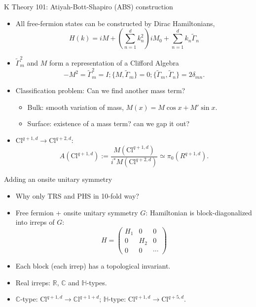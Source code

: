 \documentclass[xcolor=table, 11pt, aspectratio=169]{beamer}
\begin{document}
  \begin{frame}{K Theory 101: Atiyah-Bott-Shapiro (ABS) construction}
    \begin{itemize}
      \item All free-fermion states can be constructed by Dirac Hamiltonians,
      \[H(k)=iM+\left(\sum_{n=1}^d k_n^2\right)iM_0+\sum_{n=1}^d k_n\tilde{\Gamma}_n\]
      \item $\tilde \Gamma_m^2$ and $M$ form a representation of a Clifford Algebra
      \[-M^2=\tilde \Gamma_m^2=I; \{M,\tilde\Gamma_m\}=0;
      \{\tilde\Gamma_m,\tilde\Gamma_n\}=2\delta_{mn}.\]
      \item Classification problem: Can we find another mass term?
      \begin{itemize}
        \item Bulk: smooth variation of mass, $M(x)=M\cos x+M'\sin x$.
        \item Surface: existence of a mass term? can we gap it out?
      \end{itemize}
      \item $\mathrm{Cl}^{q+1,d}\rightarrow\mathrm{Cl}^{q+2,d}$:
      \[A(\mathrm{Cl}^{q+1,d}):=\frac{M(\mathrm{Cl}^{q+1,d})}{i^\ast M(\mathrm{Cl}^{q+2,d})}\simeq\pi_0(R^{q+1,d}).\]
    \end{itemize}
  \end{frame}

  \begin{frame}{Adding an onsite unitary symmetry}
    \begin{itemize}
      \item Why only TRS and PHS in 10-fold way?
      \item Free fermion + onsite unitary symmetry $G$: Hamiltonian is block-diagonalized into irreps of $G$:
      \[H=\begin{pmatrix}
        H_1 & 0 & 0\\
        0 & H_2 & 0\\
        0 & 0 & \cdots
      \end{pmatrix}\]
      \item Each block (each irrep) has a topological invariant.
      \item Real irreps: $\mathbb R$, $\mathbb C$ and $\mathbb H$-types.
      \item $\mathbb C$-type: $\mathrm{Cl}^{q+1,d}\rightarrow \mathbb{C}\mathrm{l}^{q+1+d}$;
      $\mathbb H$-type: $\mathrm{Cl}^{q+1,d}\rightarrow \mathrm{Cl}^{q+5,d}$.
    \end{itemize}
  \end{frame}
\end{document}
